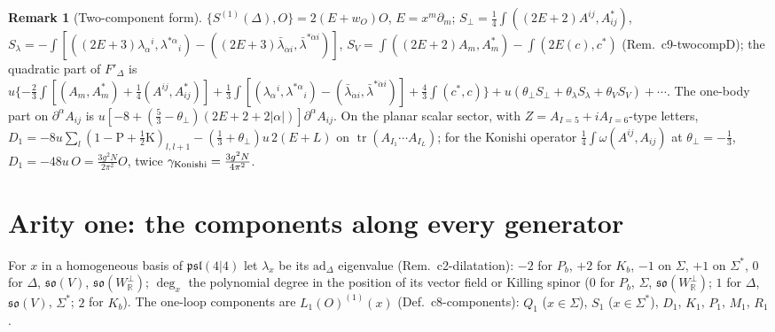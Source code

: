 \documentclass[11pt]{article}
\numberwithin{equation}{section}
\theoremstyle{plain}
\theoremstyle{definition}
\newtheorem{remark}[theorem]{Remark}
\begin{document}
\begin{remark}[Two-component form]
$\{S^{(1)}(\Delta),O\}=2(E+w_O)O$, $E=x^m\partial_m$; $S_\perp=\tfrac14\int((2E+2)A^{ij},A^*_{ij})$, $S_\lambda=-\int[((2E+3)\lambda_\alpha{}^i,\lambda^{*\alpha}{}_i)-((2E+3)\bar\lambda_{\dot\alpha i},\bar\lambda^{*\dot\alpha i})]$, $S_V=\int((2E+2)A_m,A^*_m)-\int(2E(c),c^*)$ (Rem.~c9-twocompD); the quadratic part of $F'_\Delta$ is $u\{-\tfrac23\int[(A_m,A^*_m)+\tfrac14(A^{ij},A^*_{ij})]+\tfrac13\int[(\lambda_\alpha{}^i,\lambda^{*\alpha}{}_i)-(\bar\lambda_{\dot\alpha i},\bar\lambda^{*\dot\alpha i})]+\tfrac43\int(c^*,c)\}+u(\theta_\perp S_\perp+\theta_\lambda S_\lambda+\theta_VS_V)+\cdots$. The one-body part on $\partial^\alpha A_{ij}$ is $u[-8+(\tfrac53-\theta_\perp)(2E+2+2|\alpha|)]\partial^\alpha A_{ij}$. On the planar scalar sector, with $Z=A_{I=5}+iA_{I=6}$-type letters, $D_1=-8u\sum_l(1-\mathrm P+\tfrac12\mathrm K)_{l,l+1}-(\tfrac13+\theta_\perp)u\,2(E+L)$ on $\operatorname{tr}(A_{I_1}\cdots A_{I_L})$; for the Konishi operator $\tfrac14\int\omega(A^{ij},A_{ij})$ at $\theta_\perp=-\tfrac13$, $D_1=-48u\,O=\tfrac{3g^2N}{2\pi^2}O$, twice $\gamma_{\rm Konishi}=\tfrac{3g^2N}{4\pi^2}$.
\end{remark}


\section{Arity one: the components along every generator}
\label{sec:tl-arity1}

For $x$ in a homogeneous basis of $\mathfrak{psl}(4|4)$ let $\lambda_x$ be its $\mathrm{ad}_\Delta$ eigenvalue (Rem.~c2-dilatation): $-2$ for $P_b$, $+2$ for $K_b$, $-1$ on $\Sigma$, $+1$ on $\Sigma^*$, $0$ for $\Delta$, $\mathfrak{so}(V)$, $\mathfrak{so}(W_{\mathbb R}^\perp)$; $\deg_x$ the polynomial degree in the position of its vector field or Killing spinor ($0$ for $P_b$, $\Sigma$, $\mathfrak{so}(W_{\mathbb R}^\perp)$; $1$ for $\Delta$, $\mathfrak{so}(V)$, $\Sigma^*$; $2$ for $K_b$). The one-loop components are $L_1(O)^{(1)}(x)$ (Def.~c8-components): $Q_1$ ($x\in\Sigma$), $S_1$ ($x\in\Sigma^*$), $D_1$, $K_1$, $P_1$, $M_1$, $R_1$.
\end{document}
